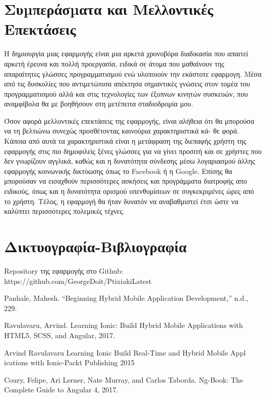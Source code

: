 \documentclass[a4paper,12pt]{article}
\begin{document}
		\clearpage
	
		\newpage
		\section{ Συµπεράσµατα και Μελλοντικές Επεκτάσεις}	

		Η δημιουργία μιας εφαρμογής είναι μια αρκετά
		χρονοβόρα διαδικασία που απαιτεί αρκετή έρευνα και πολλή προεργασία,
		ειδικά σε άτομα που μαθαίνουν της απαραίτητες γλώσσες προγραμματισμού ενώ υλοποιούν
		την εκάστοτε εφαρμογη. Μέσα από τις δυσκολίες που αντιμετώπισα απέκτησα σημαντικές γνώσεις
		στον τομέα του προγραμματισμού αλλά και στις τεχνολογίες των έξυπνων κινητών συσκευών, που αναμφίβολα
		θα με βοηθήσουν στη μετέπειτα σταδιοδρομία μου. 

		Όσον αφορά μελλοντικές επεκτάσεις της εφαρμογής, είναι αλήθεια ότι θα
		μπορούσα να τη βελτιώνω συνεχώς προσθέτοντας καινούρια χαρακτηριστικά κά-
		θε φορά. Κάποια από αυτά τα χαρακτηριστικά είναι η μετάφραση της διεπαφής χρήστη της εφαρμογής στις πιο δημοφιλείς ξένες γλώσσες για να γίνει προσιτή και σε χρήστες που δεν γνωρίζουν αγγλικά, καθώς και η δυνατότητα σύνδεσης μέσω λογαριασμού άλλης εφαρμογής κοινωνικής δικτύωσης όπως το Facebook ή η Google. Επίσης θα μπορούσαν να εισαχθούν περισσότερες ασκήσεις και προγράμματα διατροφής απο ειδικούς, όπως και η δυνατότητα
		ορισμού υπενθυμίσεων σε συγκεκριμένες ώρες από το χρήστη. Τέλος, η εφαρμογή θα ήταν δυνατόν να αναβαθμιστεί έτσι ώστε να καλύπτει περισσότερες πολεμικές τέχνες.

		\clearpage
					
		\section{Δικτυογραφία-Βιβλιογραφία}

			Repository της εφαρμογής στο Github: https://github.com/GeorgeDoit/PtixiakiLatest

			Panhale, Mahesh. “Beginning Hybrid Mobile Application Development,” n.d., 229.

			Ravulavaru, Arvind. Learning Ionic: Build Hybrid Mobile Applications with HTML5, SCSS, and Angular, 2017.

			Arvind Ravulavaru Learning Ionic Build Real-Time and Hybrid 
			Mobile Appl
			ications with Ionic-Packt Publishing 2015
			
			Coury, Felipe, Ari Lerner, Nate Murray, and Carlos Taborda. Ng-Book: The Complete Guide to Angular 4, 2017.
\end{document}
